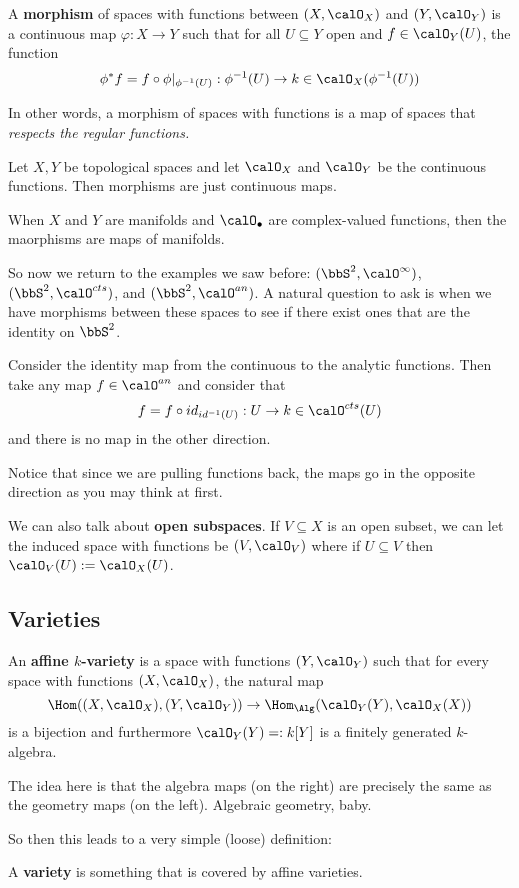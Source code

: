\documentclass[12pt]{article}
\begin{document}
\begin{defn}
	A \textbf{morphism} of spaces with functions between $(X,\calO_X)$ and $(Y,\calO_Y)$ is a continuous map 
	$\varphi:X\to Y$ such that for all $U\subseteq Y$ open and $f\in\calO_Y(U)$, the function 
	\[\phi^\ast f=f\circ\phi|_{\phi^{-1}(U)}:\phi^{-1}(U)\to k\in \calO_X(\phi^{-1}(U))\]

	In other words, a morphism of spaces with functions is a map of spaces that \textit{respects the regular functions.}
\end{defn}
\begin{ex}
	Let $X,Y$ be topological spaces and let $\calO_X$ and $\calO_Y$ be the continuous functions. Then morphisms are just continuous maps.
\end{ex}
\begin{ex}
	When $X$ and $Y$ are manifolds and $\calO_\bullet$ are complex-valued functions, then the maorphisms are maps 
	of manifolds.
\end{ex}

So now we return to the examples we saw before: $(\bbS^2,\calO^\infty)$, $(\bbS^2,\calO^{cts})$, and $(\bbS^2,\calO^{an})$.
A natural question to ask is when we have morphisms between these spaces to see if there exist ones that are the identity on $\bbS^2$.

Consider the identity map from the continuous to the analytic functions. Then take any map $f\in\calO^{an}$ and consider that 
\[f=f\circ id_{id^{-1}(U)}:U\to k\in\calO^{cts}(U)\]
and there is no map in the other direction.
\begin{rmk}
	Notice that since we are pulling functions back, the maps go in the opposite direction as you may think at first.
\end{rmk}

We can also talk about \textbf{open subspaces}. If $V\subseteq X$ is an open subset, we can let the induced space with functions 
be $(V,\calO_V)$ where if $U\subseteq V$ then $\calO_V(U):=\calO_X(U)$.

\subsection{Varieties}
\begin{defn}
	An \textbf{affine $k$-variety} is a space with functions $(Y,\calO_Y)$ such that for every space with functions $(X,\calO_X)$,
	the natural map 
	\[\Hom((X,\calO_X),(Y,\calO_Y))\to\Hom_{\Alg}(\calO_Y(Y),\calO_X(X))\]
	is a bijection and furthermore $\calO_Y(Y)=:k[Y]$ is a finitely generated $k$-algebra.
\end{defn}
\begin{rmk}
	The idea here is that the algebra maps (on the right) are precisely the same as the geometry maps (on the left).
	Algebraic geometry, baby.
\end{rmk}
So then this leads to a very simple (loose) definition:
\begin{defn}
	A \textbf{variety} is something that is covered by affine varieties.
\end{defn}
\end{document}
